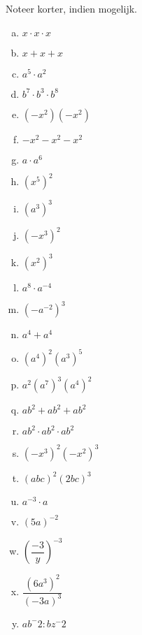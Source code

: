 \documentclass[12pt,twoside]{article}
\begin{document}
\begin{oefening}
Noteer korter, indien mogelijk.
\begin{multicols}{3}
  \begin{enumerate}[(a)]
    \itemsep1.75em
    \item $x\cdot x\cdot x$
    \item $x+x+x$
    \item $a^5\cdot a^2$
    \item $b^7\cdot b^3\cdot b^8$
    \item $\left(-x^2\right)\left(-x^2\right)$
    \item $-x^2-x^2-x^2$
    \item $a\cdot a^6$
    \item $\left(x^5\right)^2$
    \item $\left(a^3\right)^3$
    \item $\left(-x^3\right)^2$
    \item $\left(x^2\right)^3$
    \item $a^8\cdot a^{-4}$
    \item $\left(-a^{-2}\right)^3$
    \item $a^4+a^4$
    \item $\left(a^4\right)^2\left(a^3\right)^5$
    \item $a^2\left(a^7\right)^3\left(a^4\right)^2$
    \item $ab^2+ab^2+ab^2$
    \item $ab^2\cdot ab^2\cdot ab^2$
    \item $\left(-x^3\right)^2\left(-x^2\right)^3$
    \item $\left(abc\right)^2\left(2bc\right)^3$
    \item $a^{-3}\cdot a$
    \item $\left(5a\right)^{-2}$
    \item $\left(\dfrac{-3}{y}\right)^{-3}$
    \item $\dfrac{\left(6a^3\right)^2}{\left(-3a\right)^3}$
    \item $ab^-2:bz^-2$
  \end{enumerate}
\end{multicols}
\end{oefening}
\end{document}
